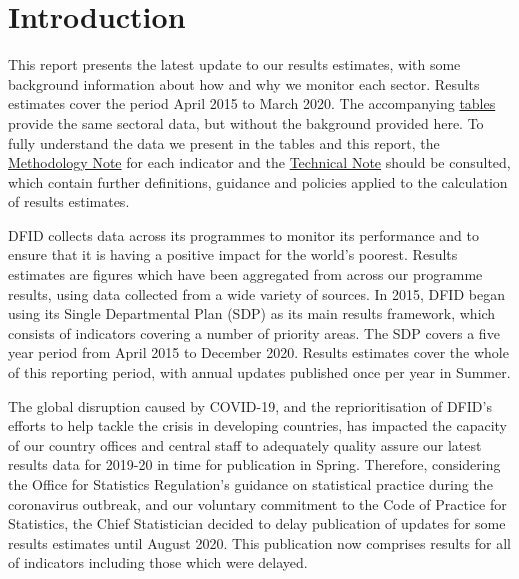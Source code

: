 \chapter*{Introduction}

\thispagestyle{empty}

This report presents the latest update to our results estimates, with some background information about how and why we monitor each sector. %
Results estimates cover the period April 2015 to March 2020. %
The accompanying \href{tables}{tables} provide the same sectoral data, but without the bakground provided here. %
To fully understand the data we present in the tables and this report, the \href{Methodology Note}{Methodology Note} for each indicator and the \href{Technical Note}{Technical Note} should be consulted, which contain further definitions, guidance and policies applied to the calculation of results estimates. %

DFID collects data across its programmes to monitor its performance and to ensure that it is having a positive impact for the world's poorest. %
Results estimates are figures which have been aggregated from across our programme results, using data collected from a wide variety of sources. %
In 2015, DFID began using its Single Departmental Plan (SDP) as its main results framework, which consists of indicators covering a number of priority areas. %
The SDP covers a five year period from April 2015 to December 2020.
Results estimates cover the whole of this reporting period, with annual updates published once per year in Summer. %


The global disruption caused by COVID-19, and the reprioritisation of DFID's efforts to help tackle the crisis in developing countries, has impacted the capacity of our country offices and central staff to adequately quality assure our latest results data for 2019-20 in time for publication in Spring. %
Therefore, considering the Office for Statistics Regulation's guidance on statistical practice during the coronavirus outbreak, and our voluntary commitment to the Code of Practice for Statistics, the Chief Statistician decided to delay publication of updates for some results estimates until August 2020. %
This publication now comprises results for all of indicators including those which were delayed. %


\newpage
